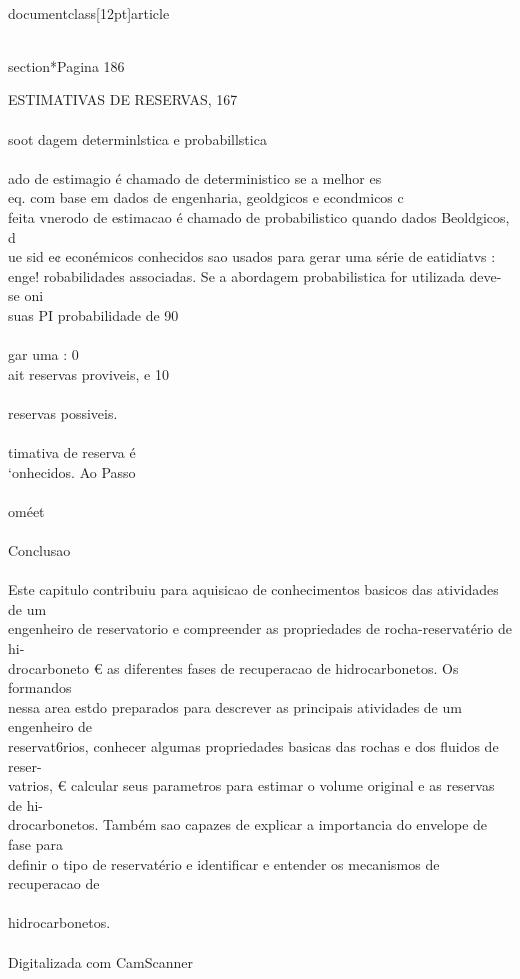 \\documentclass[12pt]{article}
\begin{document}
\\section*{Pagina 186}

ESTIMATIVAS DE RESERVAS, 167\\
\\
soot dagem determinlstica e probabillstica\\
\\
ado de estimagio é chamado de deterministico se a melhor es\\
eq. com base em dados de engenharia, geoldgicos e econdmicos c\\
feita vnerodo de estimacao é chamado de probabilistico quando dados Beoldgicos, d\\
ue sid e¢ econémicos conhecidos sao usados para gerar uma série de eatidiatvs :\\
enge! robabilidades associadas. Se a abordagem probabilistica for utilizada deve-se oni\\
suas PI probabilidade de 90\\%
\\
gar uma : 0\\%
ait reservas proviveis, e 10\\%
\\
reservas possiveis.\\
\\
timativa de reserva é\\
‘onhecidos. Ao Passo\\
\\
oméet\\
\\
Conclusao\\
\\
Este capitulo contribuiu para aquisicao de conhecimentos basicos das atividades de um\\
engenheiro de reservatorio e compreender as propriedades de rocha-reservatério de hi-\\
drocarboneto € as diferentes fases de recuperacao de hidrocarbonetos. Os formandos\\
nessa area estdo preparados para descrever as principais atividades de um engenheiro de\\
reservat6rios, conhecer algumas propriedades basicas das rochas e dos fluidos de reser-\\
vatrios, € calcular seus parametros para estimar o volume original e as reservas de hi-\\
drocarbonetos. Também sao capazes de explicar a importancia do envelope de fase para\\
definir o tipo de reservatério e identificar e entender os mecanismos de recuperacao de\\
\\
hidrocarbonetos.\\
\\
Digitalizada com CamScanner\\
\end{document}
